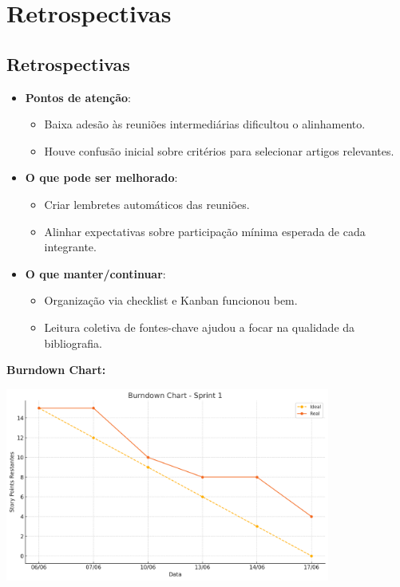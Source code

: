\section{Retrospectivas}

\subsection{Retrospectivas}

\begin{itemize}
  \item \textbf{Pontos de atenção}:
  \begin{itemize}
    \item Baixa adesão às reuniões intermediárias dificultou o alinhamento.
    \item Houve confusão inicial sobre critérios para selecionar artigos relevantes.
  \end{itemize}

  \item \textbf{O que pode ser melhorado}:
  \begin{itemize}
    \item Criar lembretes automáticos das reuniões.
    \item Alinhar expectativas sobre participação mínima esperada de cada integrante.
  \end{itemize}

  \item \textbf{O que manter/continuar}:
  \begin{itemize}
    \item Organização via checklist e Kanban funcionou bem.
    \item Leitura coletiva de fontes-chave ajudou a focar na qualidade da bibliografia.
  \end{itemize}
\end{itemize}

\vspace{1em}
\noindent\textbf{Burndown Chart:}

\begin{center}
  \includegraphics[width=0.8\textwidth]{pictures/burndown_sprint1.png}
\end{center}

